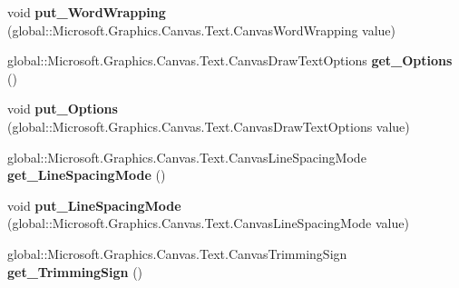 \begin{DoxyCompactItemize}
\item 
\mbox{\label{class_microsoft_1_1_graphics_1_1_canvas_1_1_text_1_1_canvas_text_layout_ad00875174765b3f2e3c1294ce86a36eb}} 
void {\bfseries put\+\_\+\+Word\+Wrapping} (global\+::\+Microsoft.\+Graphics.\+Canvas.\+Text.\+Canvas\+Word\+Wrapping value)
\item 
\mbox{\label{class_microsoft_1_1_graphics_1_1_canvas_1_1_text_1_1_canvas_text_layout_a1c7fdcf691594d0a65ccb802ba2da272}} 
global\+::\+Microsoft.\+Graphics.\+Canvas.\+Text.\+Canvas\+Draw\+Text\+Options {\bfseries get\+\_\+\+Options} ()
\item 
\mbox{\label{class_microsoft_1_1_graphics_1_1_canvas_1_1_text_1_1_canvas_text_layout_ad2eb965b4419db8c2fc551212750ef9e}} 
void {\bfseries put\+\_\+\+Options} (global\+::\+Microsoft.\+Graphics.\+Canvas.\+Text.\+Canvas\+Draw\+Text\+Options value)
\item 
\mbox{\label{class_microsoft_1_1_graphics_1_1_canvas_1_1_text_1_1_canvas_text_layout_a80e906d0512252d17b70c935fcc440a5}} 
global\+::\+Microsoft.\+Graphics.\+Canvas.\+Text.\+Canvas\+Line\+Spacing\+Mode {\bfseries get\+\_\+\+Line\+Spacing\+Mode} ()
\item 
\mbox{\label{class_microsoft_1_1_graphics_1_1_canvas_1_1_text_1_1_canvas_text_layout_a99b5936e69b1769d738e3d0437fa745d}} 
void {\bfseries put\+\_\+\+Line\+Spacing\+Mode} (global\+::\+Microsoft.\+Graphics.\+Canvas.\+Text.\+Canvas\+Line\+Spacing\+Mode value)
\item 
\mbox{\label{class_microsoft_1_1_graphics_1_1_canvas_1_1_text_1_1_canvas_text_layout_a5c236351aff1b822b001c6d58d99a4ef}} 
global\+::\+Microsoft.\+Graphics.\+Canvas.\+Text.\+Canvas\+Trimming\+Sign {\bfseries get\+\_\+\+Trimming\+Sign} ()
\item 
\mbox{\label{class_microsoft_1_1_graphics_1_1_canvas_1_1_text_1_1_canvas_text_layout_a6038b04e1633c19a344323c3adb9048c}} 

\end{DoxyCompactItemize}
